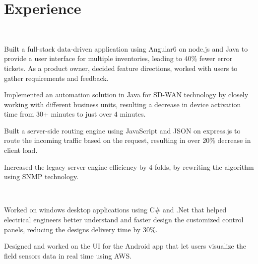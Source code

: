 \documentclass[]{rinkal_resume}
\begin{document}
\begin{minipage}[t]{0.69\textwidth} 


\section{Experience}

\hfill\   
\vspace{\topsep} %
\begin{tightemize}
\item Built a full-stack data-driven application using Angular6 on node.js and Java to provide a user interface for multiple inventories, leading to 40\% fewer error tickets. As a product owner, decided feature directions, worked with users to gather requirements and feedback.
\item Implemented an automation solution in Java for SD-WAN technology by closely working with different business units, resulting a decrease in device activation time from 30+ minutes to just over 4 minutes.
\item Built a server-side routing engine using JavaScript and JSON on express.js to route the incoming traffic based on the request, resulting in over 20\% decrease in client load.
\item Increased the legacy server engine efficiency by 4 folds, by rewriting the algorithm using SNMP technology.
\end{tightemize}
\smallsectionsep

 \\
\begin{tightemize}
\item Worked on windows desktop applications using C\# and .Net that helped electrical engineers better understand and faster design the customized control panels, reducing the designs delivery time by 30\%.
\item Designed and worked on the UI for the Android app that let users visualize the field sensors data in real time using AWS.
\end{tightemize}
\smallsectionsep




\end{minipage}
\end{document}
